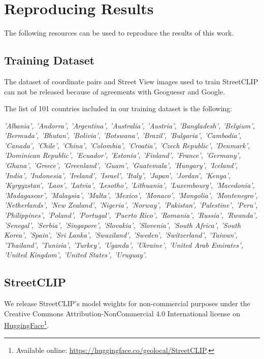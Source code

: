 \documentclass{article}
\begin{document}
\section{Reproducing Results}

The following resources can be used to reproduce the results of this work.

\subsection{Training Dataset}
\label{app:trainingdataset}

The dataset of coordinate pairs and Street View images used to train StreetCLIP can not be released because of agreements with Geoguessr and Google.

The list of 101 countries included in our training dataset is the following:

\textit{'Albania',
 'Andorra',
 'Argentina',
 'Australia',
 'Austria',
 'Bangladesh',
 'Belgium',
 'Bermuda',
 'Bhutan',
 'Bolivia',
 'Botswana',
 'Brazil',
 'Bulgaria',
 'Cambodia',
 'Canada',
 'Chile',
 'China',
 'Colombia',
 'Croatia',
 'Czech Republic',
 'Denmark',
 'Dominican Republic',
 'Ecuador',
 'Estonia',
 'Finland',
 'France',
 'Germany',
 'Ghana',
 'Greece',
 'Greenland',
 'Guam',
 'Guatemala',
 'Hungary',
 'Iceland',
 'India',
 'Indonesia',
 'Ireland',
 'Israel',
 'Italy',
 'Japan',
 'Jordan',
 'Kenya',
 'Kyrgyzstan',
 'Laos',
 'Latvia',
 'Lesotho',
 'Lithuania',
 'Luxembourg',
 'Macedonia',
 'Madagascar',
 'Malaysia',
 'Malta',
 'Mexico',
 'Monaco',
 'Mongolia',
 'Montenegro',
 'Netherlands',
 'New Zealand',
 'Nigeria',
 'Norway',
 'Pakistan',
 'Palestine',
 'Peru',
 'Philippines',
 'Poland',
 'Portugal',
 'Puerto Rico',
 'Romania',
 'Russia',
 'Rwanda',
 'Senegal',
 'Serbia',
 'Singapore',
 'Slovakia',
 'Slovenia',
 'South Africa',
 'South Korea',
 'Spain',
 'Sri Lanka',
 'Swaziland',
 'Sweden',
 'Switzerland',
 'Taiwan',
 'Thailand',
 'Tunisia',
 'Turkey',
 'Uganda',
 'Ukraine',
 'United Arab Emirates',
 'United Kingdom',
 'United States',
 'Uruguay'}.

\subsection{StreetCLIP}

We release StreetCLIP's model weights for non-commercial purposes under the Creative Commons Attribution-NonCommercial 4.0 International license on \href{https://huggingface.co/geolocal/StreetCLIP}{HuggingFace}\footnote{Available online: \href{https://huggingface.co/geolocal/StreetCLIP}{https://huggingface.co/geolocal/StreetCLIP}.}.
\end{document}
